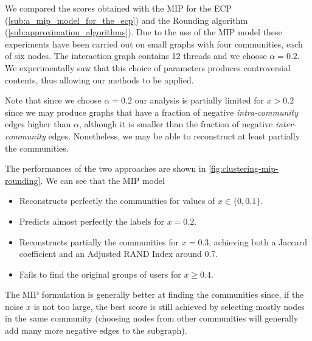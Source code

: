 We compared the scores obtained with the \acrshort{MIP} for the \acrshort{ECP}
(\autoref{sub:a_mip_model_for_the_ecp}) and the Rounding algorithm
(\autoref{sub:approximation_algorithms}). Due to the use of the
\acrshort{MIP} model these experiments have been carried out on
small graphs with four communities, each of six nodes. The interaction graph
contains 12 threads and we choose $\alpha = 0.2$. We experimentally saw that
this choice of parameters produces controversial contents, thus allowing our
methods to be applied.

Note that since we choose $\alpha = 0.2$ our analysis is partially limited for $x
	> 0.2$ since we may produce graphs that have a fraction of negative
\emph{intra-community} edges
higher than $\alpha $, although it is smaller than the fraction of negative
\emph{inter-community} edges. Nonetheless, we may be able to reconstruct at least
partially the communities.

The performances of the two approaches are shown in
\autoref{fig:clustering-mip-rounding}. We can see that the MIP model
\begin{itemize}
	\item Reconstructs perfectly the communities for values of $x \in \{0,
		      0.1\}$.
	\item Predicts almost perfectly the labels for $x= 0.2$.
	\item Reconstructs partially the communities for $x = 0.3$, achieving both
	      a Jaccard coefficient and an Adjusted RAND Index around $0.7$.
	\item Fails to find the original groups of users for $x \geq 0.4$.
\end{itemize}

The MIP formulation is generally better at finding the communities since, if
the noise $x$ is not too large, the best score is still achieved
by selecting mostly nodes in the same community (choosing nodes from other
communities will generally add many more negative edges to the subgraph).

